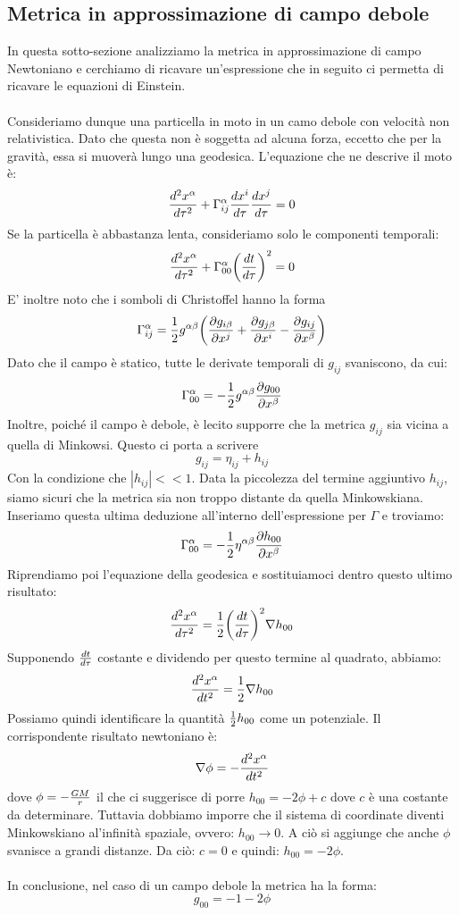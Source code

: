 \documentclass[]{report}
\theoremstyle{definition}
\theoremstyle{Theorem}
\theoremstyle{definition}
\theoremstyle{definition}
\theoremstyle{definition}
\begin{document}
\subsection{Metrica in approssimazione di campo debole}
In questa sotto-sezione analizziamo la metrica in approssimazione di campo Newtoniano e cerchiamo di ricavare un'espressione che in seguito ci permetta di ricavare le equazioni di Einstein.\\
\\
Consideriamo dunque una particella in moto in un camo debole con velocità non relativistica. Dato che questa non è soggetta ad alcuna forza, eccetto che per la gravità, essa si muoverà lungo una geodesica. L'equazione che ne descrive il moto è:
$${d^2x^\alpha\over d\tau^2}+\Gamma^\alpha_{ij}{dx^i\over d\tau}{dx^j\over d\tau}=0$$ 
Se la particella è abbastanza lenta, consideriamo solo le componenti temporali:
$${d^2x^\alpha\over d\tau^2}+\Gamma^\alpha_{00}\bigg{(}{dt\over d\tau}\bigg{)}^2=0$$
E' inoltre noto che i somboli di Christoffel hanno la forma
$$\Gamma_{ij}^\alpha={1\over 2}g^{\alpha\beta}\bigg{(}{\partial g_{i\beta}\over \partial x^j}+{\partial g_{j\beta}\over \partial x^i}-{\partial g_{ij}\over \partial x^\beta}\bigg{)}$$
Dato che il campo è statico, tutte le derivate temporali di $g_{ij}$ svaniscono, da cui:
$$\Gamma^\alpha_{00}=-{1\over 2}g^{\alpha\beta}{\partial g_{00}\over \partial x^\beta}$$
Inoltre, poiché il campo è debole, è lecito supporre che la metrica $g_{ij}$ sia vicina a quella di Minkowsi. Questo ci porta a scrivere
$$g_{ij}=\eta_{ij}+h_{ij}$$
Con la condizione che $|h_{ij}|<<1$. Data la piccolezza del termine aggiuntivo $h_{ij}$, siamo sicuri che la metrica sia non troppo distante da quella Minkowskiana. Inseriamo questa ultima deduzione all'interno dell'espressione per $\Gamma$ e troviamo:
$$\Gamma^\alpha_{00}=-{1\over 2}\eta^{\alpha\beta}{\partial h_{00}\over \partial x^\beta}$$
Riprendiamo poi l'equazione della geodesica e sostituiamoci dentro questo ultimo risultato:
$${d^2x^\alpha\over d\tau^2}={1\over 2}\bigg{(}{dt\over d\tau}\bigg{)}^2\nabla h_{00}$$
Supponendo $dt\over d\tau$ costante e dividendo per questo termine al quadrato, abbiamo:
$${d^2x^\alpha\over dt^2}={1\over 2}\nabla h_{00}$$
Possiamo quindi identificare la quantità ${1\over 2}h_{00}$ come un potenziale. Il corrispondente risultato newtoniano è:
$$\nabla\phi=-{d^2x^\alpha\over dt^2}$$
dove $\phi=-{GM\over r}$
il che ci suggerisce di porre $h_{00}=-2\phi+c$ dove $c$ è una costante da determinare. Tuttavia dobbiamo imporre che il sistema di coordinate diventi Minkowskiano al'infinità spaziale, ovvero: $h_{00}\rightarrow 0$. A ciò si aggiunge che anche $\phi$ svanisce a grandi distanze. Da ciò: $c=0$ e quindi: $h_{00}=-2\phi$.\\
\\
In conclusione, nel caso di un campo debole la metrica ha la forma:
$$g_{00}=-1-2\phi$$
\end{document}
